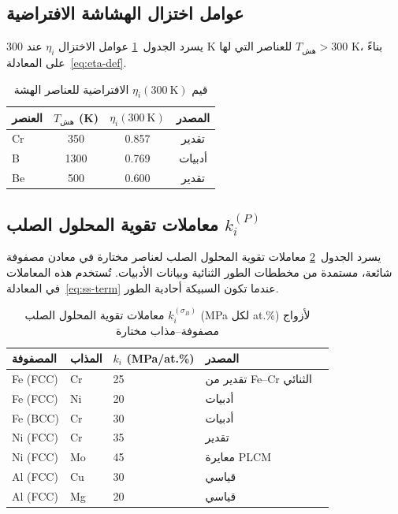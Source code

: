 \documentclass[12pt,a4paper]{article}
\begin{document}
	\subsection{عوامل اختزال الهشاشة الافتراضية}
	\label{subsec:eta-table}
	يسرد الجدول~\ref{tab:eta} عوامل الاختزال \(\eta_i\) عند 300 K للعناصر التي لها \(T_{\text{هش}} > 300\) K، بناءً على المعادلة~\ref{eq:eta-def}.
	
	\begin{table}[htbp]
		\centering
		\caption{قيم \(\eta_i(300\ \mathrm{K})\) الافتراضية للعناصر الهشة}
		\label{tab:eta}
		\begin{tabular}{lccc}
			\toprule
			\textbf{العنصر} & \(T_{\text{هش}}\) (K) & \(\eta_i(300\ \mathrm{K})\) & \textbf{المصدر} \\
			\midrule
			Cr & 350 & 0.857 & تقدير \\
			B  & 1300 & 0.769 & أدبيات \\
			Be & 500 & 0.600 & تقدير \\
			\bottomrule
		\end{tabular}
	\end{table}
	
	\subsection{معاملات تقوية المحلول الصلب \(k_i^{(P)}\)}
	\label{subsec:kss}
	
	يسرد الجدول~\ref{tab:kss} معاملات تقوية المحلول الصلب لعناصر مختارة في معادن مصفوفة شائعة، مستمدة من مخططات الطور الثنائية وبيانات الأدبيات. تُستخدم هذه المعاملات في المعادلة~\ref{eq:ss-term} عندما تكون السبيكة أحادية الطور.
	
	\begin{longtable}{p{2cm} p{2cm} p{2cm} p{2cm} p{2cm}}
		\caption{معاملات تقوية المحلول الصلب \(k_i^{(\sigma_B)}\) (MPa لكل at.\%) لأزواج مصفوفة–مذاب مختارة}\label{tab:kss}\\
		\toprule
		\textbf{المصفوفة} & \textbf{المذاب} & \(k_i\) (MPa/at.\%) & \textbf{المصدر} \\
		\midrule
		Fe (FCC) & Cr & 25 & تقدير من Fe–Cr الثنائي \\
		Fe (FCC) & Ni & 20 & أدبيات \\
		Fe (BCC) & Cr & 30 & أدبيات \\
		Ni (FCC) & Cr & 35 & تقدير \\
		Ni (FCC) & Mo & 45 & معايرة PLCM \\
		Al (FCC) & Cu & 30 & قياسي \\
		Al (FCC) & Mg & 20 & قياسي \\
		\bottomrule
	\end{longtable}
	
\end{document}
